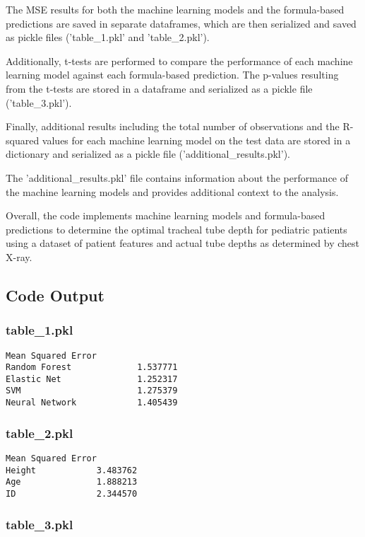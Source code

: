 \documentclass[11pt]{article}
\begin{document}
The MSE results for both the machine learning models and the formula-based predictions are saved in separate dataframes, which are then serialized and saved as pickle files ('table\_1.pkl' and 'table\_2.pkl').

Additionally, t-tests are performed to compare the performance of each machine learning model against each formula-based prediction. The p-values resulting from the t-tests are stored in a dataframe and serialized as a pickle file ('table\_3.pkl').

Finally, additional results including the total number of observations and the R-squared values for each machine learning model on the test data are stored in a dictionary and serialized as a pickle file ('additional\_results.pkl').

The 'additional\_results.pkl' file contains information about the performance of the machine learning models and provides additional context to the analysis.

Overall, the code implements machine learning models and formula-based predictions to determine the optimal tracheal tube depth for pediatric patients using a dataset of patient features and actual tube depths as determined by chest X-ray.

\subsection{Code Output}

\subsubsection*{table\_1.pkl}

\begin{Verbatim}[tabsize=4]
                Mean Squared Error
Random Forest             1.537771
Elastic Net               1.252317
SVM                       1.275379
Neural Network            1.405439
\end{Verbatim}

\subsubsection*{table\_2.pkl}

\begin{Verbatim}[tabsize=4]
        Mean Squared Error
Height            3.483762
Age               1.888213
ID                2.344570
\end{Verbatim}

\subsubsection*{table\_3.pkl}
\end{document}
